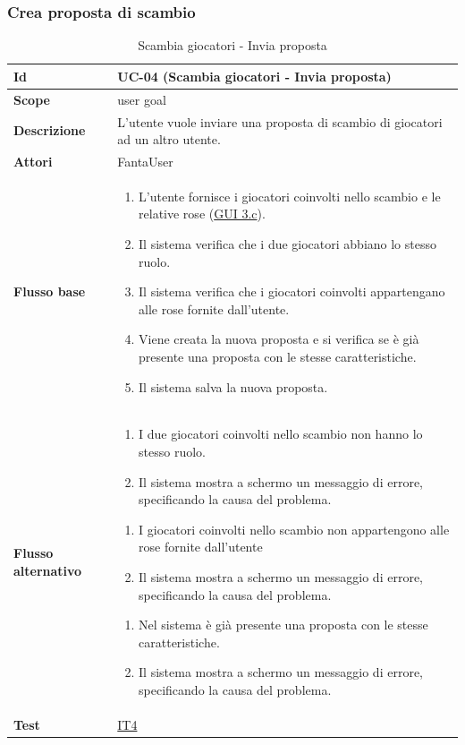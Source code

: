 \subsubsection{Crea proposta di scambio}
\begin{table}[H]
\caption{Scambia giocatori - Invia proposta}
\label{UC-04}

\begin{tabularx}{\textwidth}{|l|X|}
\hline
\textbf{Id} & UC-04 (Scambia giocatori - Invia proposta) \\
\hline
\textbf{Scope} & user goal \\
\hline
\textbf{Descrizione} & L'utente vuole inviare una proposta di scambio di giocatori ad un altro utente. \\
\hline
\textbf{Attori} & FantaUser \\
\hline
\textbf{Flusso base} &
\begin{enumerate}[leftmargin=*]
    \item L'utente fornisce i giocatori coinvolti nello scambio e le relative rose (\hyperref[fig:mockup_parte3]{GUI 3.c}).
    \item Il sistema verifica che i due giocatori abbiano lo stesso ruolo.
    \item Il sistema verifica che i giocatori coinvolti appartengano alle rose fornite dall'utente.
    \item Viene creata la nuova proposta e si verifica se è già presente una 
            proposta con le stesse caratteristiche.
    \item Il sistema salva la nuova proposta.
\end{enumerate} \\
\hline
\textbf{Flusso alternativo} &
\begin{enumerate}[leftmargin=*,label=2.\arabic*]
    \item I due giocatori coinvolti nello scambio non hanno lo stesso ruolo.
    \item Il sistema mostra a schermo un messaggio di errore, specificando la causa del problema.
\end{enumerate}
\begin{enumerate}[leftmargin=*,label=3.\arabic*]
    \item I giocatori coinvolti nello scambio non appartengono alle rose fornite dall'utente
    \item Il sistema mostra a schermo un messaggio di errore, specificando la causa del problema.
\end{enumerate} 
\begin{enumerate}[leftmargin=*,label=4.\arabic*]
    \item Nel sistema è già presente una proposta con le stesse caratteristiche.
    \item Il sistema mostra a schermo un messaggio di errore, specificando la causa del problema.
\end{enumerate} \\
\hline
\textbf{Test} & \hyperref[IT4]{IT4} \\
\hline
\end{tabularx}

\end{table}


